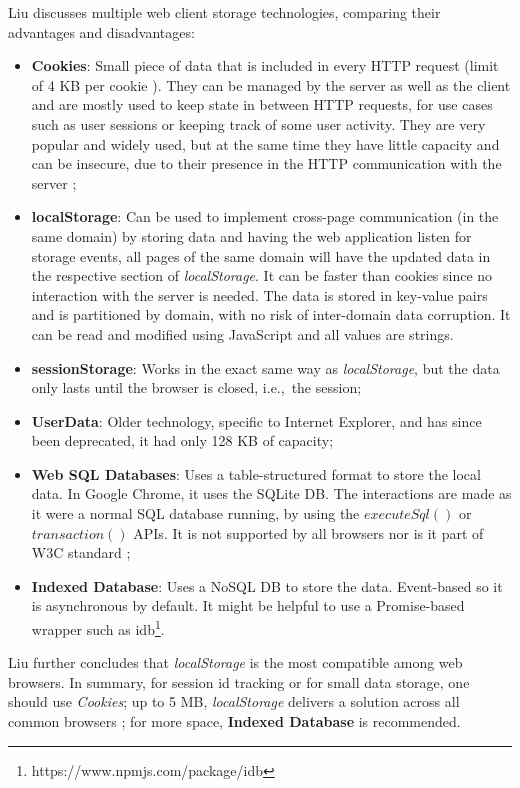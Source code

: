 Liu \cite{Liu2014} discusses multiple web client storage technologies, comparing their advantages and disadvantages:
\begin{itemize}
    \item \textbf{Cookies}: Small piece of data that is included in every HTTP request (limit of 4 KB per cookie \cite{cookies-rfc}). They can be managed by the server as well as the client and are mostly used to keep state in between HTTP requests, for use cases such as user sessions or keeping track of some user activity. They are very popular and widely used, but at the same time they have little capacity and can be insecure, due to their presence in the HTTP communication with the server \cite{Velagapudi2019} \cite{Kwon2020};
    \item \textbf{localStorage}: Can be used to implement cross-page communication (in the same domain) by storing data and having the web application listen for storage events, all pages of the same domain will have the updated data in the respective section of \textit{localStorage}. It can be faster than cookies since no interaction with the server is needed.
    The data is stored in key-value pairs and is partitioned by domain, with no risk of inter-domain data corruption. It can be read and modified using JavaScript and all values are strings.
    \item \textbf{sessionStorage}: Works in the exact same way as \textit{localStorage}, but the data only lasts until the browser is closed, i.e.,\ the session;
    \item \textbf{UserData}: Older technology, specific to Internet Explorer, and has since been deprecated, it had only 128 KB of capacity;
    \item \textbf{Web SQL Databases}: Uses a table-structured format to store the local data. In Google Chrome, it uses the SQLite DB. The interactions are made as it were a normal SQL database running, by using the $executeSql()$ or $transaction()$ APIs. It is not supported by all browsers nor is it part of W3C standard \cite{WebSQL-storage-w3c};
    \item \textbf{Indexed Database}: Uses a NoSQL DB to store the data. Event-based so it is asynchronous by default. It might be helpful to use a Promise-based wrapper \cite{promises-js-mdn} such as idb\footnote{https://www.npmjs.com/package/idb}.
\end{itemize}
Liu further concludes that \textit{localStorage} is the most compatible among web browsers. In summary, for session id tracking or for small data storage, one should use \textit{Cookies}; up to 5 MB, \textit{localStorage} delivers a solution across all common browsers \cite{webstorage-w3c}; for more space, \textbf{Indexed Database} is recommended.

